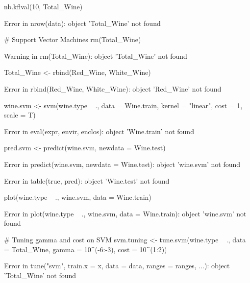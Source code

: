 \documentclass[letterpaper]{article}\usepackage[]{graphicx}\usepackage[]{color}
\begin{document}
\begin{Schunk}
\begin{Sinput}
nb.kflval(10, Total_Wine)
\end{Sinput}
\begin{Soutput}
Error in nrow(data): object 'Total_Wine' not found
\end{Soutput}
\begin{Sinput}
# Support Vector Machines
rm(Total_Wine)
\end{Sinput}
\begin{Soutput}
Warning in rm(Total_Wine): object 'Total_Wine' not found
\end{Soutput}
\begin{Sinput}
Total_Wine <- rbind(Red_Wine, White_Wine)
\end{Sinput}
\begin{Soutput}
Error in rbind(Red_Wine, White_Wine): object 'Red_Wine' not found
\end{Soutput}
\begin{Sinput}
wine.svm <- svm(wine.type ~ ., data = Wine.train, kernel = "linear", cost = 1, 
    scale = T)
\end{Sinput}
\begin{Soutput}
Error in eval(expr, envir, enclos): object 'Wine.train' not found
\end{Soutput}
\begin{Sinput}
pred.svm <- predict(wine.svm, newdata = Wine.test)
\end{Sinput}
\begin{Soutput}
Error in predict(wine.svm, newdata = Wine.test): object 'wine.svm' not found
\end{Soutput}
\begin{Soutput}
Error in table(true, pred): object 'Wine.test' not found
\end{Soutput}
\begin{Sinput}
plot(wine.type ~ ., wine.svm, data = Wine.train)
\end{Sinput}
\begin{Soutput}
Error in plot(wine.type ~ ., wine.svm, data = Wine.train): object 'wine.svm' not found
\end{Soutput}
\begin{Sinput}
# Tuning gamma and cost on SVM
svm.tuning <- tune.svm(wine.type ~ ., data = Total_Wine, gamma = 10^(-6:-3), 
    cost = 10^(1:2))
\end{Sinput}
\begin{Soutput}
Error in tune("svm", train.x = x, data = data, ranges = ranges, ...): object 'Total_Wine' not found

\end{Soutput}
\end{Schunk}
\end{document}
